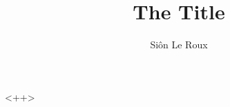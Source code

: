 \documentclass[a4paper]{article}
\author{Si\^on Le Roux}
\title{The Title}
\begin{document}
\maketitle
<++>
\end{document}
